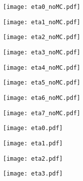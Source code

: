 \documentclass[12pt]{article}
\begin{document}
\begin{figure}[htbp]
\centering
\texttt{[image: eta0\_noMC.pdf]}
\end{figure}
\clearpage

\begin{figure}[htbp]
\centering
\texttt{[image: eta1\_noMC.pdf]}
\end{figure}
\clearpage

\begin{figure}[htbp]
\centering
\texttt{[image: eta2\_noMC.pdf]}
\end{figure}
\clearpage

\begin{figure}[htbp]
\centering
\texttt{[image: eta3\_noMC.pdf]}
\end{figure}
\clearpage

\begin{figure}[htbp]
\centering
\texttt{[image: eta4\_noMC.pdf]}
\end{figure}
\clearpage

\begin{figure}[htbp]
\centering
\texttt{[image: eta5\_noMC.pdf]}
\end{figure}
\clearpage

\begin{figure}[htbp]
\centering
\texttt{[image: eta6\_noMC.pdf]}
\end{figure}
\clearpage

\begin{figure}[htbp]
\centering
\texttt{[image: eta7\_noMC.pdf]}
\end{figure}
\clearpage



\begin{figure}[htbp]
\centering
\texttt{[image: eta0.pdf]}
\end{figure}
\clearpage

\begin{figure}[htbp]
\centering
\texttt{[image: eta1.pdf]}
\end{figure}
\clearpage

\begin{figure}[htbp]
\centering
\texttt{[image: eta2.pdf]}
\end{figure}
\clearpage

\begin{figure}[htbp]
\centering
\texttt{[image: eta3.pdf]}
\end{figure}
\clearpage
\end{document}
